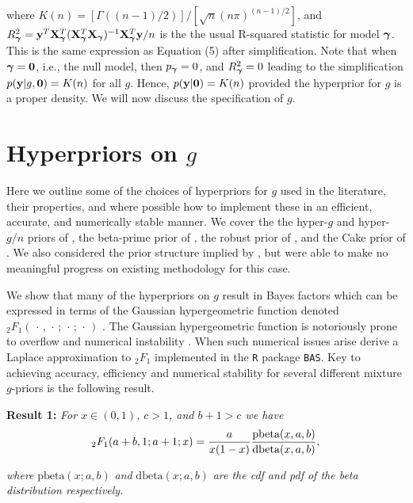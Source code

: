 \noindent where $K(n) = [\Gamma( (n-1)/2 )]/[\sqrt{n}(n\pi)^{(n-1)/2}]$, and
$R_{\boldsymbol \gamma}^2 =
{\bf y}^T{\bf X}_{\boldsymbol \gamma}^T({\bf X}_{\boldsymbol \gamma}^T{\bf X}_{\boldsymbol \gamma})^{-1}{\bf X}_{\boldsymbol \gamma}^T{\bf y}/n$ is the the
usual R-squared statistic for model ${\boldsymbol \gamma}$.  This is the same expression as
\cite{Liang2008} Equation (5) after simplification. Note that when ${\boldsymbol \gamma} =
{\bf 0}$, i.e., the null model, then $p_{\boldsymbol \gamma} = 0$, and $R_{\boldsymbol \gamma}^2 = 0$
leading to the simplification $p({\bf y}|g,{\bf 0}) = K(n)$ for all $g$. Hence,
$p({\bf y}|{\bf 0}) = K(n)$ provided the hyperprior for $g$ is a proper density. We
will now discuss the specification of $g$.


\section{Hyperpriors on $g$}
\label{sec:hyperpriors}

Here we outline some of the choices of hyperpriors for $g$ used in the
literature, their properties, and where possible how to implement these in an
efficient, accurate, and numerically stable manner. We cover the the hyper-$g$
and hyper-$g/n$ priors of \cite{Liang2008}, the beta-prime prior of
\cite{Maruyama2011}, the robust prior of \cite{Bayarri2012}, and the Cake prior
of \cite{OrmerodEtal2017}.  We also considered the prior structure implied by
\cite{Zellner1980}, but were able to make no meaningful progress on existing
methodology for this case.

We show that many of the hyperpriors on $g$ result in Bayes factors which can
be expressed in terms of the Gaussian hypergeometric function denoted
${}_2F_1(\,\cdot\,,\,\cdot\,;\,\cdot\,;\,\cdot\,)$ \citep[see for example
Chapter 15 of ][]{Abramowitz1972}.  The Gaussian hypergeometric function is
notoriously prone to overflow and numerical instability \citep{Pearson2017}.
When such numerical issues arise \cite{Liang2008} derive a Laplace
approximation to ${}_2F_1$ implemented in the {\tt R} package {\tt BAS}.  Key
to achieving accuracy, efficiency and numerical stability for several different
mixture $g$-priors is the following result.

 
\noindent 
{\bf Result 1:} {\it For $x\in(0,1)$, $c>1$, and $b +1 > c$ we have}
\begin{equation}\label{eq:logGuassHypergeometric2}
	\displaystyle {}_2F_1(a+b,1;a+1;x) = \frac{a}{x(1 - x)}   \frac{\mbox{pbeta}(x,a,b)}{\mbox{dbeta}(x,a,b)},
\end{equation}

\noindent 
{\it where} $\mbox{pbeta}(x;a,b)$ {\it and} $\mbox{dbeta}(x;a,b)$ {\it are the cdf and pdf of the beta 
	distribution respectively.}

